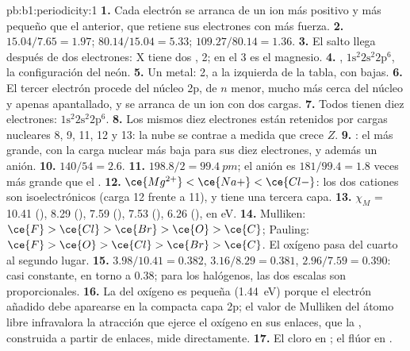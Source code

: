 \begin{solution}{pb:b1:periodicity:1}
\textbf{1.} Cada electrón se arranca de un ion más positivo y más pequeño
que el anterior, que retiene sus electrones con más fuerza.
\textbf{2.} $15.04/7.65 = 1.97$; $80.14/15.04 = 5.33$; $109.27/80.14 = 1.36$.
\textbf{3.} El salto llega después de dos electrones: X tiene dos
,  2; en el  3 es el magnesio.
\textbf{4.} , $1\text{s}^2 2\text{s}^2 2\text{p}^6$, la
configuración del neón.
\textbf{5.} Un metal:  2, a la izquierda de la tabla, con  bajas.
\textbf{6.} El tercer electrón procede del núcleo 2p, de $n$ menor, mucho
más cerca del núcleo y apenas apantallado, y se arranca de un ion con dos
cargas.
\textbf{7.} Todos tienen diez electrones: $1\text{s}^2 2\text{s}^2 2\text{p}^6$.
\textbf{8.} Los mismos diez electrones están retenidos por cargas
nucleares 8, 9, 11, 12 y 13: la nube se contrae a medida que crece $Z$.
\textbf{9.} : el más grande, con la carga nuclear más baja
para sus diez electrones, y además un anión.
\textbf{10.} $140/54 = 2.6$.
\textbf{11.} $198.8/2 = \qty{99.4}{pm}$; el anión es $181/99.4 = 1.8$
veces más grande que el .
\textbf{12.} $\ce{Mg^{2+}} < \ce{Na+} < \ce{Cl-}$: los dos cationes son
isoelectrónicos (carga 12 frente a 11), y  tiene una tercera capa.
\textbf{13.} $\chi_M$ = 10.41 (), 8.29 (), 7.59 (),
7.53 (), 6.26 (), en eV.
\textbf{14.} Mulliken: $\ce{F} > \ce{Cl} > \ce{Br} > \ce{O} > \ce{C}$;
Pauling: $\ce{F} > \ce{O} > \ce{Cl} > \ce{Br} > \ce{C}$. El oxígeno pasa
del cuarto al segundo lugar.
\textbf{15.} $3.98/10.41 = 0.382$, $3.16/8.29 = 0.381$, $2.96/7.59 =
0.390$: casi constante, en torno a 0.38; para los halógenos, las dos
escalas son proporcionales.
\textbf{16.} La  del oxígeno es pequeña
(\qty{1.44}{eV}) porque el electrón añadido debe aparearse en la compacta
capa 2p; el valor de Mulliken del átomo libre infravalora la atracción que
ejerce el oxígeno en sus enlaces, que la , construida a
partir de enlaces, mide directamente.
\textbf{17.} El cloro en ; el flúor en .

\end{solution}
